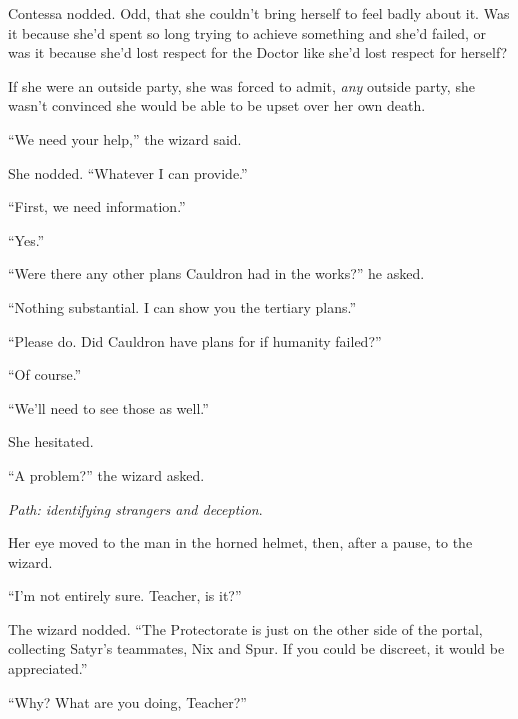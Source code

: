 Contessa nodded.  Odd, that she couldn't bring herself to feel badly about it.  Was it because she'd spent so long trying to achieve something and she'd failed, or was it because she'd lost respect for the Doctor like she'd lost respect for herself?



If she were an outside party, she was forced to admit, \emph{any} outside party, she wasn't convinced she would be able to be upset over her own death.



``We need your help,'' the wizard said.



She nodded.  ``Whatever I can provide.''



``First, we need information.''



``Yes.''



``Were there any other plans Cauldron had in the works?'' he asked.



``Nothing substantial.  I can show you the tertiary plans.''



``Please do.  Did Cauldron have plans for if humanity failed?''



``Of course.''



``We'll need to see those as well.''



She hesitated.



``A problem?'' the wizard asked.



\emph{Path: identifying strangers and deception}.



Her eye moved to the man in the horned helmet, then, after a pause, to the wizard.



``I'm not entirely sure.  Teacher, is it?''



The wizard nodded.  ``The Protectorate is just on the other side of the portal, collecting Satyr's teammates, Nix and Spur.  If you could be discreet, it would be appreciated.''



``Why?  What are you doing, Teacher?''



